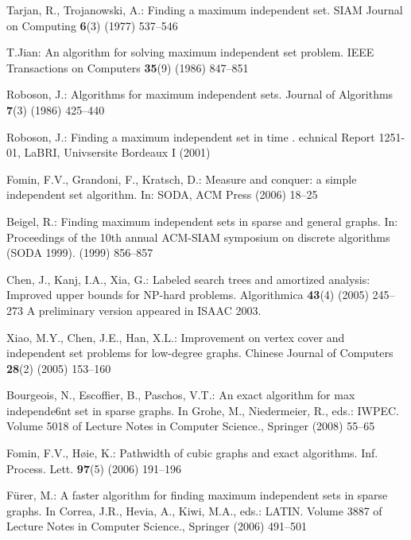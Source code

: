 \documentclass[runningheads]{llncs}
\begin{document}

\begin{thebibliography}{10}

Tarjan, R., Trojanowski, A.:
\newblock Finding a maximum independent set.
\newblock SIAM Journal on Computing \textbf{6}(3) (1977)  537--546

T.Jian:
\newblock An  algorithm for solving maximum independent set
  problem.
\newblock IEEE Transactions on Computers \textbf{35}(9) (1986)  847--851

Roboson, J.:
\newblock Algorithms for maximum independent sets.
\newblock Journal of Algorithms \textbf{7}(3) (1986)  425--440

Roboson, J.:
\newblock Finding a maximum independent set in time .
echnical {R}eport 1251-01, LaBRI, Univsersite Bordeaux I (2001)

Fomin, F.V., Grandoni, F., Kratsch, D.:
\newblock Measure and conquer: a simple  independent set
  algorithm.
\newblock In: SODA, ACM Press (2006)  18--25

Beigel, R.:
\newblock Finding maximum independent sets in sparse and general graphs.
\newblock In: Proceedings of the 10th annual ACM-SIAM symposium on discrete
  algorithms (SODA 1999). (1999)  856--857

Chen, J., Kanj, I.A., Xia, G.:
\newblock Labeled search trees and amortized analysis: Improved upper bounds
  for {NP}-hard problems.
\newblock Algorithmica \textbf{43}(4) (2005)  245--273 A preliminary version
  appeared in ISAAC 2003.

Xiao, M.Y., Chen, J.E., Han, X.L.:
\newblock Improvement on vertex cover and independent set problems for
  low-degree graphs.
\newblock Chinese Journal of Computers \textbf{28}(2) (2005)  153--160

Bourgeois, N., Escoffier, B., Paschos, V.T.:
\newblock An  exact algorithm for max independe6nt set in
  sparse graphs.
\newblock In Grohe, M., Niedermeier, R., eds.: IWPEC. Volume 5018 of Lecture
  Notes in Computer Science., Springer (2008)  55--65

Fomin, F.V., H{\o}ie, K.:
\newblock Pathwidth of cubic graphs and exact algorithms.
\newblock Inf. Process. Lett. \textbf{97}(5) (2006)  191--196

F{\"u}rer, M.:
\newblock A faster algorithm for finding maximum independent sets in sparse
  graphs.
\newblock In Correa, J.R., Hevia, A., Kiwi, M.A., eds.: LATIN. Volume 3887 of
  Lecture Notes in Computer Science., Springer (2006)  491--501


\end{thebibliography}
\end{document}
